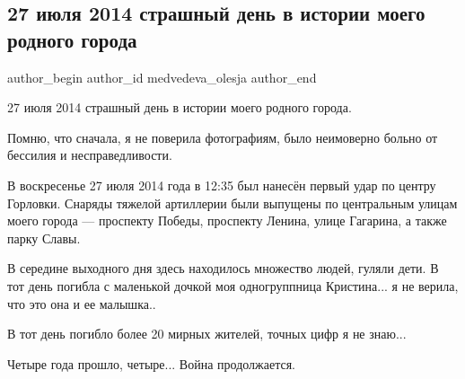  
 
 
 
 
 
\subsection{27 июля 2014 страшный день в истории моего родного города}
\label{sec:27_07_2018.fb.medvedeva_olesja.1.gorlovka}
 
\ifcmt
 author_begin
   author_id medvedeva_olesja
 author_end
\fi

27 июля 2014 страшный день в истории моего родного города. 

Помню, что сначала, я не поверила фотографиям, было неимоверно больно от
бессилия и несправедливости. 

В воскресенье 27 июля 2014 года в 12:35 был нанесён первый удар по центру
Горловки. Снаряды тяжелой артиллерии были выпущены по центральным улицам моего
города — проспекту Победы, проспекту Ленина, улице Гагарина, а также парку
Славы. 

В середине выходного дня здесь находилось множество людей, гуляли дети. В тот
день погибла с маленькой дочкой моя одногруппница Кристина... я не верила, что
это она и ее малышка..

В тот день погибло более 20 мирных жителей, точных цифр я не знаю...

Четыре года прошло, четыре... Война продолжается.

